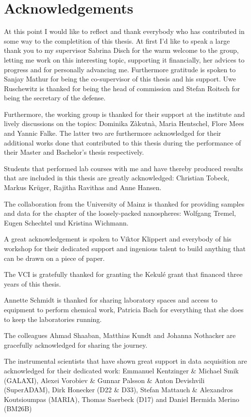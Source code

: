 \documentclass[\main/dresen_thesis.tex]{subfiles}
\begin{document}
	\section*{Acknowledgements}
	At this point I would like to reflect and thank everybody who has contributed in some way to the completition of this thesis.
	At first I'd like to speak a large thank you to my supervisor Sabrina Disch for the warm welcome to the group, letting me work on this interesting topic, supporting it financially, her advices to progress and for personally advancing me.
	Furthermore gratitude is spoken to Sanjay Mathur for being the co-supervisor of this thesis and his support.
	Uwe Ruschewitz is thanked for being the head of commission and Stefan Roitsch for being the secretary of the defense.

	Furthermore, the working group is thanked for their support at the institute and lively discussions on the topics: Dominika Zàkutnà, Maria Hentschel, Flore Mees and Yannic Falke.
	The latter two are furthermore acknowledged for their additional works done that contributed to this thesis during the performance of their Master and Bachelor's thesis respectively.

	Students that performed lab courses with me and have thereby produced results that are included in this thesis are greatly acknowledged: Christian Tobeck, Markus Kr\"uger, Rajitha Ravithas and Anne Hansen.

	The collaboration from the University of Mainz is thanked for providing samples and data for the chapter of the loosely-packed nanospheres: Wolfgang Tremel, Eugen Schechtel und Kristina Wichmann.

	A great acknowledgement is spoken to Viktor Klippert and everybody of his workshop for their dedicated support and ingenious talent to build anything that can be drawn on a piece of paper.

	The VCI is gratefully thanked for granting the Kekulé grant that financed three years of this thesis.

	Annette Schmidt is thanked for sharing laboratory spaces and access to equipment to perform chemical work, Patricia Bach for everything that she does to keep the laboratories running.

	The colleagues Ahmad Shaaban, Matthias Kundt and Johanna Nothacker are gracefully acknowledged for sharing the journey.

	The instrumental scientists that have shown great support in data acquisition are acknowledged for their dedicated work:
	Emmanuel Kentzinger \& Michael Smik (GALAXI), Alexei Vorobiev \& Gunnar Palsson \& Anton Devishvili (SuperADAM), Dirk Honecker (D22 \& D33), Stefan Mattauch \& Alexandros Koutsioumpas (MARIA), Thomas Saerbeck (D17) and Daniel Hermida Merino (BM26B)
\end{document}
